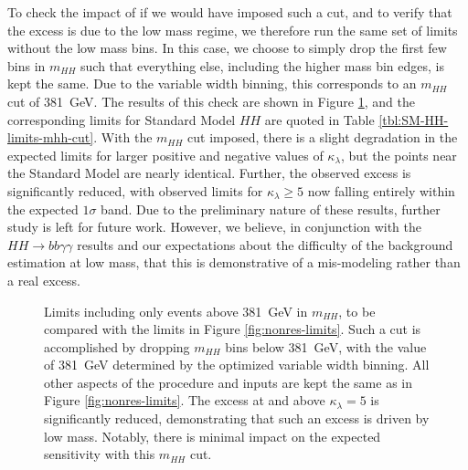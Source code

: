 To check the impact of if we would have imposed such a cut, and to verify that the excess is due to the low mass regime, 
we therefore run the same set of limits without the low mass bins. In this case, we choose to simply drop the 
first few bins in $m_{HH}$ such that everything else, including the higher mass bin edges, is kept the same. Due to 
the variable width binning, this corresponds to an $m_{HH}$ cut of \SI{381}{\GeV}. The results of this check are shown 
in Figure \ref{fig:nonres-limits-with-cut}, and the corresponding limits for Standard Model $HH$ are 
quoted in Table \ref{tbl:SM-HH-limits-mhh-cut}.
With the $m_{HH}$ cut imposed, there is a slight degradation in the expected limits for larger positive and negative 
values of $\kappa_{\lambda}$, but the points near the Standard Model are nearly identical. Further, the observed excess 
is significantly reduced, with observed limits for $\kappa_{\lambda} \geq 5$ now falling entirely within the expected 
$1\sigma$ band. Due to the preliminary nature of these results, further study is left for future work. However, 
we believe, in conjunction with the $HH\rightarrow bb\gamma\gamma$ results and our expectations about the difficulty 
of the background estimation at low mass, that this is demonstrative of a mis-modeling rather than a real excess. 

\begin{figure}[ht]
  \centering
  \caption{\label{fig:nonres-limits-with-cut} Limits including only events above \SI{381}{\GeV} in $m_{HH}$, 
  to be compared with the limits in Figure \ref{fig:nonres-limits}. Such a cut is accomplished by 
  dropping $m_{HH}$ bins below \SI{381}{\GeV}, with the value 
  of \SI{381}{\GeV} determined by the optimized variable width binning. All other aspects of the procedure 
  and inputs are kept the same as in Figure \ref{fig:nonres-limits}. The excess 
  at and above $\kappa_{\lambda} = 5$ is significantly reduced, demonstrating that such an excess is driven by 
  low mass. Notably, there is minimal impact on the expected sensitivity with this $m_{HH}$ cut.
  }
\end{figure}

